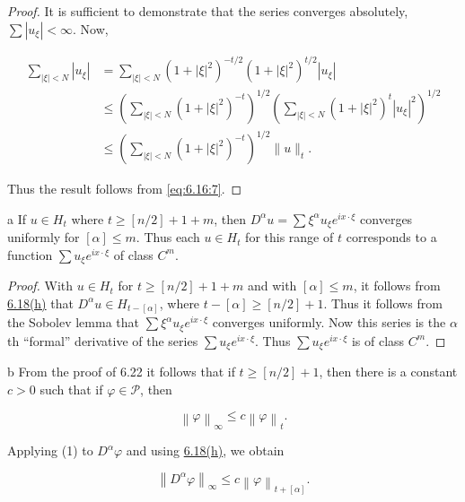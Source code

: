 \begin{proof}
It is sufficient to demonstrate that the series converges absolutely,  $ \sum |u_{\xi}| < \infty $. Now,


\[\begin{aligned}\sum_{|\xi|<N}|u_{\xi}|&=\sum_{|\xi|<N}(1+|\xi|^{2})^{-t/2}(1+|\xi|^{2})^{t/2}|u_{\xi}|\\&\leq\left(\sum_{|\xi|<N}(1+|\xi|^{2})^{-t}\right)^{1/2}\left(\sum_{|\xi|<N}(1+|\xi|^{2})^{t}|u_{\xi}|^{2}\right)^{1/2}\\&\leq\left(\sum_{|\xi|<N}(1+|\xi|^{2})^{-t}\right)^{1/2}\|u\|_{t}.\end{aligned}\]


Thus the result follows from \eqref{eq:6.16:7}.
\end{proof}

\begin{corollary*}{a}
If $u \in H_t$ where $t \geq [n/2] + 1 + m$, then $D^{\alpha} u = \sum \xi^{\alpha} u_\xi e^{ix \cdot\xi}$ converges uniformly for $[\alpha] \leq m$. Thus each $u \in H_t$ for this range of $t$ corresponds to a function $\sum u_\xi e^{ix \cdot\xi}$ of class $C^m$.
\end{corollary*}

\begin{proof}
With $u \in H_t$ for $t \geq [n/2] + 1 + m$ and with $[\alpha] \leq m$, it follows from \hyperref[thm:6.18]{6.18(h)} that $D^{\alpha} u \in H_{t-[\alpha]}$, where $t - [\alpha] \geq [n/2] + 1$. Thus it follows from the Sobolev lemma that $\sum \xi^{\alpha} u_\xi e^{ix \cdot \xi}$ converges uniformly. Now this series is the $\alpha$th “formal” derivative of the series $\sum u_\xi e^{ix \cdot \xi}$. Thus $\sum u_\xi e^{ix \cdot \xi}$ is of class $C^m$.
\end{proof}

\begin{corollary*}{b}
From the proof of 6.22 it follows that if  $ t \geq [n/2] + 1 $, then there is a constant  $ c > 0 $ such that if  $ \varphi \in \mathcal{P} $, then

\begin{equation}
\left\|\varphi\right\|_{\infty}\leq c\left\|\varphi\right\|_{t}.
\end{equation}

Applying (1) to  $ D^{\alpha} \varphi $ and using \hyperref[thm:6.18]{6.18(h)}, we obtain

\begin{equation}
\left\|D^{\alpha}\varphi\right\|_{\infty}\leq c\left\|\varphi\right\|_{t+[\alpha]}.
\end{equation}
\end{corollary*}

